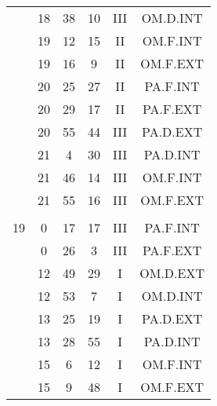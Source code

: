 \documentclass[12pt, a4paper]{article}
\begin{document}
\begin{multicols}{3}
{\begin{tabular}{c c c c c c}
	 	 	 	 & 18 & 38 & 10 & III & OM.D.INT\\%
	 	 	 	 & 19 & 12 & 15 & II & OM.F.INT\\%
	 	 	 	 & 19 & 16 & 9 & II & OM.F.EXT\\%
	 	 	 	 & 20 & 25 & 27 & II & PA.F.INT\\%
	 	 	 	 & 20 & 29 & 17 & II & PA.F.EXT\\%
	 	 	 	 & 20 & 55 & 44 & III & PA.D.EXT\\%
	 	 	 	 & 21 & 4 & 30 & III & PA.D.INT\\%
	 	 	 	 & 21 & 46 & 14 & III & OM.F.INT\\%
	 	 	 	 & 21 & 55 & 16 & III & OM.F.EXT\\%
	 	 	 	 & & & & & \\%
	 	 	 	19 & 0 & 17 & 17 & III & PA.F.INT\\%
	 	 	 	 & 0 & 26 & 3 & III & PA.F.EXT\\%
	 	 	 	 & 12 & 49 & 29 & I & OM.D.EXT\\%
	 	 	 	 & 12 & 53 & 7 & I & OM.D.INT\\%
	 	 	 	 & 13 & 25 & 19 & I & PA.D.EXT\\%
	 	 	 	 & 13 & 28 & 55 & I & PA.D.INT\\%
	 	 	 	 & 15 & 6 & 12 & I & OM.F.INT\\%
	 	 	 	 & 15 & 9 & 48 & I & OM.F.EXT\\%
	 	 \end{tabular}
 	}
\end{multicols}
\end{document}
